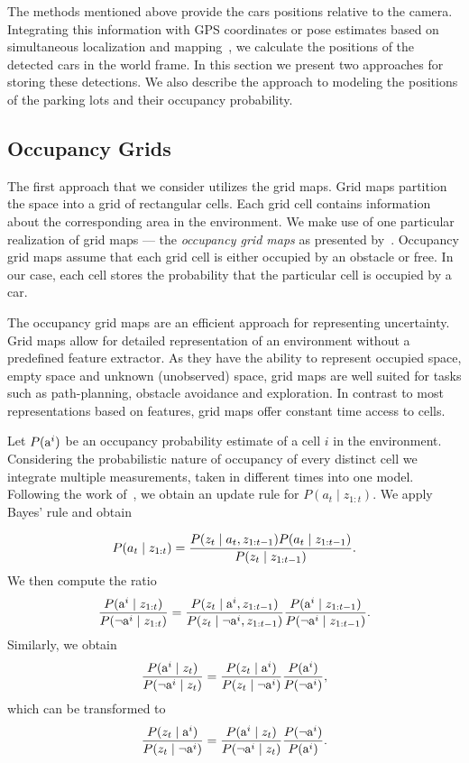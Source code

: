 The methods mentioned above provide the cars positions relative to the camera.
Integrating this information with GPS coordinates or pose estimates based on
simultaneous localization and
mapping~\cite{stachniss11isrr,kretzschmar10ki,kuemmerle11auro}, we calculate
the positions of the detected cars in the world frame. In this section we
present two approaches for storing these detections. We also describe the
approach to modeling the positions of the parking lots and their occupancy
probability.

\subsection{Occupancy Grids}
\label{sub:occupancy_grids}

The first approach that we consider utilizes the grid maps. Grid maps
partition the space into a grid of rectangular cells. Each grid cell contains
information about the corresponding area in the environment. We make use of
one particular realization of grid maps --- the \emph{occupancy grid maps} as
presented by~\citet{occupancy_grids}. Occupancy grid maps assume that each
grid cell is either occupied by an obstacle or free. In our case, each cell
stores the probability that the particular cell is occupied by a car.

The occupancy grid maps are an efficient approach for representing
uncertainty. Grid maps allow for detailed representation of an environment
without a predefined feature extractor. As they have the ability to represent
occupied space, empty space and unknown (unobserved) space, grid maps are well
suited for tasks such as path-planning, obstacle avoidance and exploration. In
contrast to most representations based on features, grid maps offer constant
time access to cells.

Let $P({\mbox{a}^i})$ be an occupancy probability estimate of a cell $i$ in the
environment. Considering the probabilistic nature of occupancy of every
distinct cell we integrate multiple measurements, taken in different times
into one model. Following the work of~\citet{occupancy_grids}, we obtain an
update rule for $P(a_t\mid z_{1:t})$. We apply Bayes' rule and obtain

\begin{equation}
P(a_t \mid  z_{1:t} ) = \frac{P(z_t \mid a_t, z_{1:t-1}) P(a_t \mid z_{1:t-1})}{P(z_t \mid z_{1:t-1})}.
\end{equation}
\noindent
We then compute the ratio
\begin{equation}
\frac{P({\mbox{a}^i}\mid z_{1:t})}{P(\neg{\mbox{a}^i} \mid z_{1:t})}
=
\frac{P(z_{t} \mid {\mbox{a}^i}, z_{1:t-1})}{P(z_{t} \mid \neg{\mbox{a}^i}, z_{1:t-1})}   \frac{P({\mbox{a}^i}\mid z_{1:t-1})}{ P(\neg{\mbox{a}^i}\mid z_{1:t-1})}.
\end{equation}
\noindent
Similarly, we obtain
\begin{equation}
\nonumber
\frac{P({\mbox{a}^i}\mid z_{t})}{P(\neg{\mbox{a}^i} \mid z_{t})} = \frac{P(z_{t} \mid {\mbox{a}^i})}{P(z_{t} \mid \neg{\mbox{a}^i})}   \frac{P({\mbox{a}^i})}{ P(\neg{\mbox{a}^i})},
\end{equation}
\noindent
which can be transformed to
\begin{equation}
\frac{P(z_{t} \mid {\mbox{a}^i})}{P(z_{t} \mid \neg{\mbox{a}^i})}
=
\frac{P({\mbox{a}^i} \mid z_{t})}{P(\neg{\mbox{a}^i} \mid z_{t})}   \frac{P(\neg{\mbox{a}^i})}{ P({\mbox{a}^i})}.
\end{equation}
\noindent

